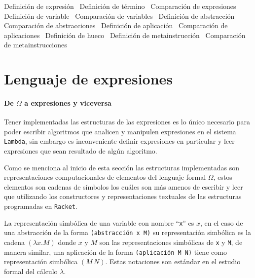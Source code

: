 \documentclass[10pt,oneside,openany,letterpaper]{book}
\begin{document}
\nwenddocs{}\endmoddef
\LA{}Definición de expresión~{\nwtagstyle{}}\RA{}
\LA{}Definición de término~{\nwtagstyle{}}\RA{}
\LA{}Comparación de expresiones~{\nwtagstyle{}}\RA{}
\LA{}Definición de variable~{\nwtagstyle{}}\RA{}
\LA{}Comparación de variables~{\nwtagstyle{}}\RA{}
\LA{}Definición de abstracción~{\nwtagstyle{}}\RA{}
\LA{}Comparación de abstracciones~{\nwtagstyle{}}\RA{}
\LA{}Definición de aplicación~{\nwtagstyle{}}\RA{}
\LA{}Comparación de aplicaciones~{\nwtagstyle{}}\RA{}
\LA{}Definición de hueco~{\nwtagstyle{}}\RA{}
\LA{}Definición de metainstrucción~{\nwtagstyle{}}\RA{}
\LA{}Comparación de metainstrucciones~{\nwtagstyle{}}\RA{}
\nwendcode{}\nwdocspar

\section{Lenguaje de expresiones}

\paragraph{De \( Ω \) a expresiones y viceversa} Tener implementadas las estructuras de las expresiones es lo único necesario para poder escribir algoritmos que analicen y manipulen expresiones en el sistema {\tt{}Lambda}, sin embargo es inconveniente definir expresiones en particular y leer expresiones que sean resultado de algún algoritmo.

Como se menciona al inicio de esta sección las estructuras implementadas son representaciones computacionales de elementos del lenguaje formal \( Ω \), estos elementos son cadenas de símbolos los cuáles son más amenos de escribir y leer que utilizando los constructores y representaciones textuales de las estructuras programadas en {\tt{}Racket}.

La representación simbólica de una variable con nombre ``{\tt{}x}'' es \( x \), en el caso de una abstracción de la forma {\tt{}(\protect{}\protect{}abstracción\ x\ M)} su representación simbólica es la cadena \( (λx.M) \) donde \( x \) y \( M \) son las representaciones simbólicas de {\tt{}x} y {\tt{}M}, de manera similar, una aplicación de la forma {\tt{}(\protect{}aplicación\ M\ N)} tiene como representación simbólica \( (M\, N) \). Estas notaciones son estándar en el estudio formal del cálculo \( λ \).
\end{document}
